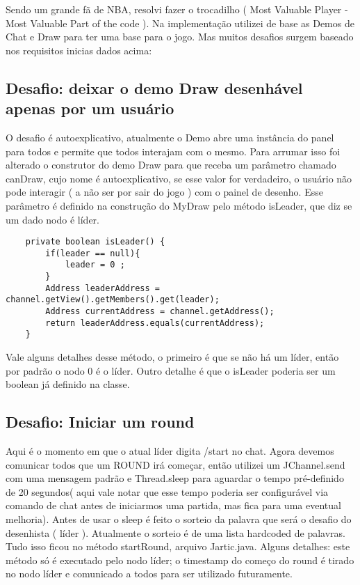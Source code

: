\documentclass{article}
\begin{document}
Sendo um grande fã de NBA, resolvi fazer o trocadilho ( Most Valuable Player - Most Valuable Part of the code ). Na implementação utilizei de base as Demos de Chat e Draw para ter uma base para o jogo. Mas muitos desafios surgem baseado nos requisitos inicias dados acima:


\subsection{Desafio: deixar o demo Draw desenhável apenas por um usuário}

O desafio é autoexplicativo, atualmente o Demo abre uma instância do panel para todos e permite que todos interajam com o mesmo. Para arrumar isso foi alterado o construtor do demo Draw para que receba um parâmetro chamado canDraw, cujo nome é autoexplicativo, se esse valor for verdadeiro, o usuário não pode interagir ( a não ser por sair do jogo ) com o painel de desenho. Esse parâmetro é definido na construção do MyDraw pelo método isLeader, que diz se um dado nodo é líder.


\begin{lstlisting} 
    private boolean isLeader() {
        if(leader == null){
            leader = 0 ;
        }
        Address leaderAddress = channel.getView().getMembers().get(leader);
        Address currentAddress = channel.getAddress();
        return leaderAddress.equals(currentAddress);
    }
\end{lstlisting} 
 Vale alguns detalhes desse método, o primeiro é que se não há um líder, então por padrão o nodo 0 é o líder. Outro detalhe é que o isLeader poderia ser um boolean já definido na classe. 
 
 
\subsection{Desafio: Iniciar um round }
 Aqui é o momento em que o atual líder digita /start no chat. Agora devemos comunicar todos que um ROUND irá começar, então utilizei um JChannel.send com uma mensagem padrão e Thread.sleep para aguardar o tempo pré-definido de 20 segundos( aqui vale notar que esse tempo poderia ser configurável via comando de chat antes de iniciarmos uma partida, mas fica para uma eventual melhoria). Antes de usar o sleep é feito o sorteio da palavra que será o desafio do desenhista ( líder ). Atualmente o sorteio é de uma lista hardcoded de palavras. Tudo isso ficou no método startRound, arquivo Jartic.java. Alguns detalhes: este método só é executado pelo nodo líder; o timestamp do começo do round é tirado no nodo líder e comunicado a todos para ser utilizado futuramente.
 
\end{document}
